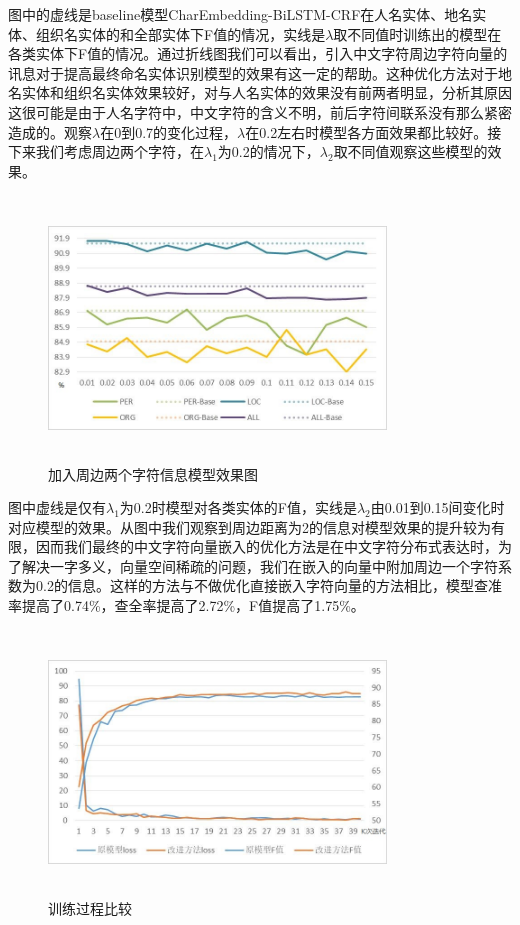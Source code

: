 \documentclass[winfonts,master,oneside,nobackinfo]{njuthesis}
\begin{document}
图中的虚线是baseline模型CharEmbedding-BiLSTM-CRF在人名实体、地名实体、组织名实体的和全部实体下F值的情况，实线是$\lambda$取不同值时训练出的模型在各类实体下F值的情况。通过折线图我们可以看出，引入中文字符周边字符向量的讯息对于提高最终命名实体识别模型的效果有这一定的帮助。这种优化方法对于地名实体和组织名实体效果较好，对与人名实体的效果没有前两者明显，分析其原因这很可能是由于人名字符中，中文字符的含义不明，前后字符间联系没有那么紧密造成的。观察$\lambda$在0到0.7的变化过程，$\lambda$在0.2左右时模型各方面效果都比较好。接下来我们考虑周边两个字符，在$\lambda_{1}$为0.2的情况下，$\lambda_{2}$取不同值观察这些模型的效果。

\begin{figure}[H]
\centering
\begin{minipage}[t]{\textwidth}
\includegraphics[width=0.8\textwidth,height=7cm]{./figure/参数2.jpg}
\caption{加入周边两个字符信息模型效果图}
\label{lab:1}
\end{minipage}
\end{figure}

图中虚线是仅有$\lambda_{1}$为0.2时模型对各类实体的F值，实线是$\lambda_{2}$由0.01到0.15间变化时对应模型的效果。从图中我们观察到周边距离为2的信息对模型效果的提升较为有限，因而我们最终的中文字符向量嵌入的优化方法是在中文字符分布式表达时，为了解决一字多义，向量空间稀疏的问题，我们在嵌入的向量中附加周边一个字符系数为0.2的信息。这样的方法与不做优化直接嵌入字符向量的方法相比，模型查准率提高了0.74\%，查全率提高了2.72\%，F值提高了1.75\%。

\begin{figure}[H]
\centering
\begin{minipage}[t]{\textwidth}
\includegraphics[width=0.8\textwidth,height=7cm]{./figure/训练过程.jpg}
\caption{训练过程比较}
\label{lab:1}
\end{minipage}
\end{figure}
\end{document}
